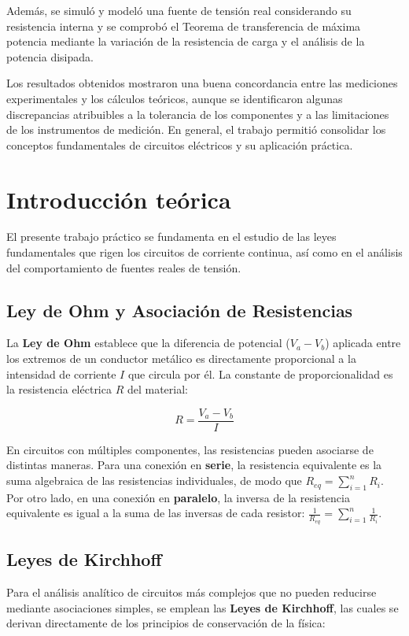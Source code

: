 \documentclass[11pt]{article}
\begin{document}
Además, se simuló y modeló una fuente de tensión real considerando su resistencia interna y se comprobó el Teorema de transferencia de máxima potencia mediante la variación de la resistencia de carga y el análisis de la potencia disipada.

Los resultados obtenidos mostraron una buena concordancia entre las mediciones experimentales y los cálculos teóricos, aunque se identificaron algunas discrepancias atribuibles a la tolerancia de los componentes y a las limitaciones de los instrumentos de medición. En general, el trabajo permitió consolidar los conceptos fundamentales de circuitos eléctricos y su aplicación práctica.

\section{Introducción teórica}

El presente trabajo práctico se fundamenta en el estudio de las leyes fundamentales que rigen los circuitos de corriente continua, así como en el análisis del comportamiento de fuentes reales de tensión.

\subsection{Ley de Ohm y Asociación de Resistencias}
La \textbf{Ley de Ohm} establece que la diferencia de potencial ($V_a - V_b$) aplicada entre los extremos de un conductor metálico es directamente proporcional a la intensidad de corriente $I$ que circula por él. La constante de proporcionalidad es la resistencia eléctrica $R$ del material:

\begin{equation}
R = \frac{V_a - V_b}{I}
\label{eq:LeyDeOhm}
\end{equation}

En circuitos con múltiples componentes, las resistencias pueden asociarse de distintas maneras. Para una conexión en \textbf{serie}, la resistencia equivalente es la suma algebraica de las resistencias individuales, de modo que $R_{eq} = \sum_{i=1}^{n} R_i$. Por otro lado, en una conexión en \textbf{paralelo}, la inversa de la resistencia equivalente es igual a la suma de las inversas de cada resistor: $\frac{1}{R_{eq}} = \sum_{i=1}^{n} \frac{1}{R_i}$.

\subsection{Leyes de Kirchhoff}
Para el análisis analítico de circuitos más complejos que no pueden reducirse mediante asociaciones simples, se emplean las \textbf{Leyes de Kirchhoff}, las cuales se derivan directamente de los principios de conservación de la física:
\end{document}
